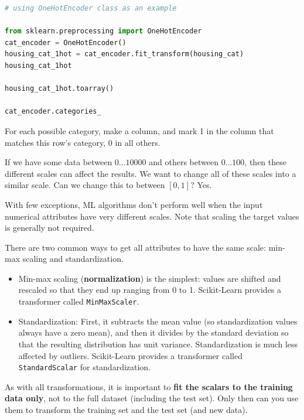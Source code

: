 {\begin{lstlisting}[language=python, breaklines=true]
# using OneHotEncoder class as an example

from sklearn.preprocessing import OneHotEncoder
cat_encoder = OneHotEncoder()
housing_cat_1hot = cat_encoder.fit_transform(housing_cat)
housing_cat_1hot

housing_cat_1hot.toarray()

cat_encoder.categories_
\end{lstlisting}
\vspace{11pt}


For each possible category, make a column, and mark 1 in the column that matches this row's category, 0 in all others.

\newpage
{}

If we have some data between $0\dots10000$ and others between $0\dots100$, then these different scales can affect the results. We want to change all of these scales into a similar scale. Can we change this to between $[0,1]$? Yes.


With few exceptions, ML algorithms don't perform well when the input numerical attributes have very different scales. Note that scaling the target values is generally not required.

There are two common ways to get all attributes to have the same scale: min-max scaling and standardization.
\begin{itemize}
    \item Min-max scaling (\textbf{normalization}) is the simplest: values are shifted and rescaled so that they end up ranging from 0 to 1. Scikit-Learn provides a transformer called \texttt{MinMaxScaler}.
    \item Standardization: First, it subtracts the mean value (so standardization values always have a zero mean), and then it divides by the standard deviation so that the resulting distribution has unit variance. Standardization is much less affected by outliers. Scikit-Learn provides a transformer called \texttt{StandardScalar} for standardization.
\end{itemize}

As with all transformations, it is important to \textbf{fit the scalars to the training data only}, not to the full dataset (including the test set). Only then can you use them to transform the training set and the test set (and new data).

}
